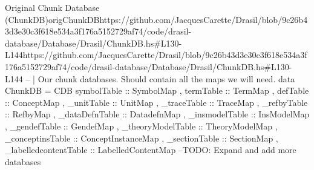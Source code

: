 \begin{haskell}{Original Chunk Database (ChunkDB)}{origChunkDB}{https://github.com/JacquesCarette/Drasil/blob/9c26b43d3e30c3f618e534a3f176a5152729a\newline{}f74/code/drasil-database/Database/Drasil/ChunkDB.hs\#L130-L144}{https://github.com/JacquesCarette/Drasil/blob/9c26b43d3e30c3f618e534a3f176a5152729af74/code/drasil-database/Database/Drasil/ChunkDB.hs\#L130-L144}
-- | Our chunk databases. Should contain all the maps we will need.
data ChunkDB = CDB { symbolTable :: SymbolMap
                   , termTable :: TermMap 
                   , defTable  :: ConceptMap
                   , _unitTable :: UnitMap
                   , _traceTable :: TraceMap
                   , _refbyTable :: RefbyMap
                   , _dataDefnTable  :: DatadefnMap
                   , _insmodelTable   :: InsModelMap
                   , _gendefTable   :: GendefMap
                   , _theoryModelTable :: TheoryModelMap
                   , _conceptinsTable :: ConceptInstanceMap
                   , _sectionTable :: SectionMap
                   , _labelledcontentTable :: LabelledContentMap
                   } --TODO: Expand and add more databases
\end{haskell}
